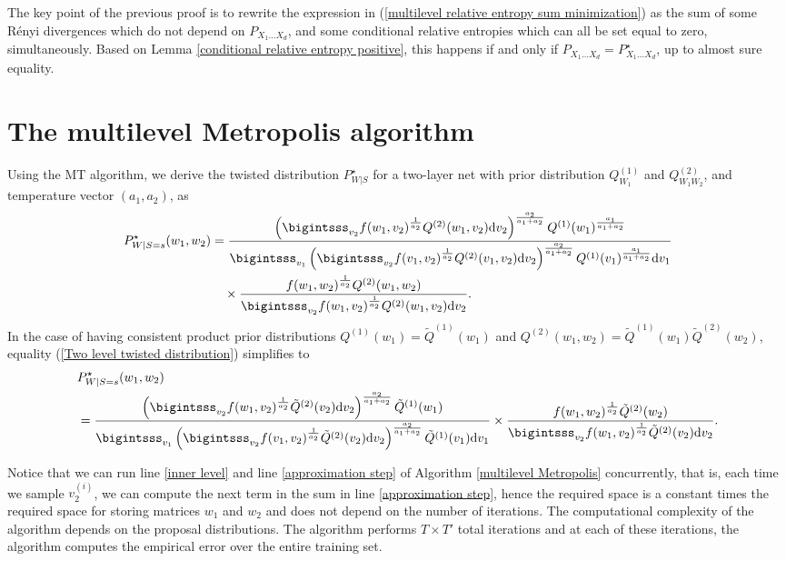 \documentclass{article}
\begin{document}
The key point of the previous proof is to rewrite the expression in (\ref{multilevel relative entropy sum minimization}) as the sum of some R\'{e}nyi divergences which do not depend on $P_{X_1\dots X_d}$, and some conditional relative entropies which can all be set equal to zero, simultaneously. Based on Lemma \ref{conditional relative entropy positive}, this happens if and only if $P_{X_1\dots X_d}= P^{\star}_{X_1\dots X_d}$, up to almost sure equality. 
\section{The multilevel Metropolis algorithm}\label{multilevel Metropolis appendix}
Using the MT algorithm, we derive the twisted distribution $P^{\star}_{W|S}$ for a two-layer net with prior distribution $Q^{(1)}_{W_1}$ and $Q^{(2)}_{W_1W_2}$, and temperature vector $(a_1,a_2)$, as
\begin{align}
	P^{\star}_{W|S=s}(w_1,w_2)
	&=\frac{\left(\bigintsss_{v_2}f(w_1,v_2)^{\frac{1}{a_2}} Q^{(2)}(w_1,v_2)\mathrm{d}v_2 \right)^{\frac{a_2}{a_1+a_2}}Q^{(1)}(w_1)^{\frac{a_1}{a_1+a_2}}}{\bigintsss_{v_1}\left(\bigintsss_{v_2}f(v_1,v_2)^{\frac{1}{a_2}}Q^{(2)}(v_1,v_2)\mathrm{d}v_2 \right)^{\frac{a_2}{a_1+a_2}}Q^{(1)}(v_1)^{\frac{a_1}{a_1+a_2}}\mathrm{d}v_1}\nonumber\\
	&\quad\times \frac{f(w_1,w_2)^{\frac{1}{a_2}}Q^{(2)}(w_1,w_2)}{\bigintsss_{v_2}f(w_1,v_2)^{\frac{1}{a_2}}Q^{(2)}(w_1,v_2)\mathrm{d}v_2}.\label{Two level twisted distribution}
\end{align}
In the case of having consistent product prior distributions $Q^{(1)}(w_1)=\tilde{Q}^{(1)}(w_1)$ and $Q^{(2)}(w_1,w_2)=\tilde{Q}^{(1)}(w_1)\tilde{Q}^{(2)}(w_2)$, equality (\ref{Two level twisted distribution}) simplifies to 
\begin{align}
	&P^{\star}_{W|S=s}(w_1,w_2)\nonumber\\
	&=\frac{\left(\bigintsss_{v_2}f(w_1,v_2)^{\frac{1}{a_2}} \tilde{Q}^{(2)}(v_2)\mathrm{d}v_2 \right)^{\frac{a_2}{a_1+a_2}}\tilde{Q}^{(1)}(w_1)}{\bigintsss_{v_1}\left(\bigintsss_{v_2}f(v_1,v_2)^{\frac{1}{a_2}}\tilde{Q}^{(2)}(v_2)\mathrm{d}v_2 \right)^{\frac{a_2}{a_1+a_2}}\tilde{Q}^{(1)}(v_1)\mathrm{d}v_1}\times \frac{f(w_1,w_2)^{\frac{1}{a_2}}\tilde{Q}^{(2)}(w_2)}{\bigintsss_{v_2}f(w_1,v_2)^{\frac{1}{a_2}}\tilde{Q}^{(2)}(v_2)\mathrm{d}v_2}. \nonumber
\end{align}

Notice that we can run line \ref{inner level} and line \ref{approximation step} of Algorithm \ref{multilevel Metropolis} concurrently, that is, each time we sample $v_2^{(i)}$, we can compute the next term in the sum in line \ref{approximation step}, hence the required space is a constant times the required space for storing matrices $w_1$ and $w_2$ and does not depend on the number of iterations. The computational complexity of the algorithm depends on the proposal distributions. The algorithm performs $T\times T'$ total iterations and at each of these iterations, the algorithm computes the empirical error over the entire training set.
\end{document}
